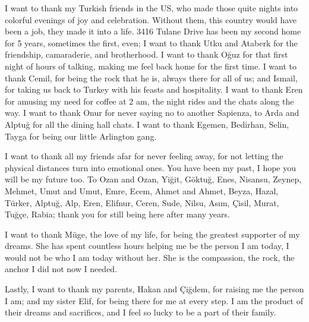 I want to thank my Turkish friends in the US, who made those quite nights into colorful
evenings of joy and celebration. Without them, this country would have been a job, they
made it into a life. 3416 Tulane Drive has been my second home for 5 years, sometimes
the first, even; I want to thank Utku and Ataberk for the friendship, camaraderie, and
brotherhood. I want to thank Oğuz for that first night of hours of talking, making me
feel back home for the first time. I want to thank Cemil, for being the rock that he
is, always there for all of us; and Ismail, for taking us back to Turkey with his
feasts and hospitality. I want to thank Eren for amusing my need for coffee at 2 am,
the night rides and the chats along the way. I want to thank Onur for never saying no
to another Sapienza, to Arda and Alptuğ for all the dining hall chats. I want to thank
Egemen, Bedirhan, Selin, Tayga for being our little Arlington gang.

I want to thank all my friends afar for never feeling away, for not letting the
physical distances turn into emotional ones. You have been my past, I hope you will be
my future too. To Ozan and Ozan, Yiğit, Göktuğ, Enes, Nisansu, Zeynep, Mehmet, Umut and
Umut, Emre, Ecem, Ahmet and Ahmet, Beyza, Hazal, Türker, Alptuğ, Alp, Eren, Elifnur,
Ceren, Sude, Nilsu, Asım, Çisil, Murat, Tuğçe, Rabia; thank you for still being here
after many years.

I want to thank Müge, the love of my life, for being the greatest supporter of my
dreams. She has spent countless hours helping me be the person I am today, I would not
be who I am today without her. She is the compassion, the rock, the anchor I did not
now I needed.

Lastly, I want to thank my parents, Hakan and Çiğdem, for raising me the person I am;
and my sister Elif, for being there for me at every step. I am the product of their
dreams and sacrifices, and I feel so lucky to be a part of their family.